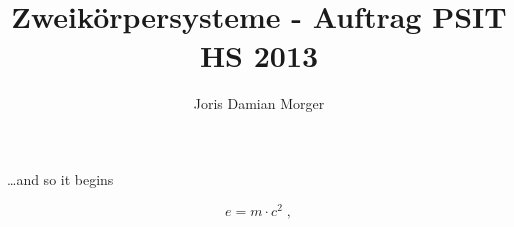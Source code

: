 \documentclass{article}
\author{Joris Damian Morger}
\title{Zweikörpersysteme - Auftrag PSIT HS 2013}
\begin{document}
\maketitle

\ldots and so it begins 

\begin{equation}
	e = m \cdot c^2 \; ,
\end{equation}
\end{document}
